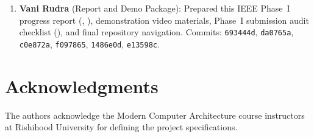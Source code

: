 \documentclass[conference]{IEEEtran}
\begin{document}
\begin{enumerate}
  \item \textbf{Vani Rudra} (Report and Demo Package):
    Prepared this IEEE Phase~I progress report (,
    ), demonstration video
    materials,
    Phase~I submission audit checklist (), and
    final repository navigation.
    Commits: \texttt{693444d}, \texttt{da0765a}, \texttt{c0e872a},
    \texttt{f097865}, \texttt{1486e0d}, \texttt{e13598c}.
\end{enumerate}

\section*{Acknowledgments}
The authors acknowledge the Modern Computer Architecture course
instructors at Rishihood University for defining the project
specifications.



\end{document}
